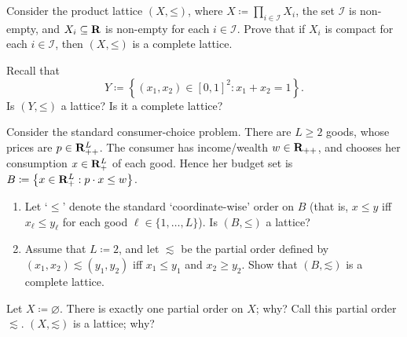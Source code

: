 \begin{exercise}
	\label{exercise:product_compl_lattice}
	Consider the product lattice $(X,\mathord{\leq})$, where $X \coloneqq \prod_{i \in \mathcal{I}} X_i$, the set $\mathcal{I}$ is non-empty, and $X_i \subseteq \mathbf{R}$ is non-empty for each $i \in \mathcal{I}$. Prove that if $X_i$ is compact for each $i \in \mathcal{I}$, then $(X,\mathord{\leq})$ is a complete lattice.
\end{exercise}

\begin{namedthm}
	\label{exercise:lb-R2_lat_e-g}
	Recall that
	\begin{equation*}
		Y \coloneqq \left\{ (x_1,x_2) \in [0,1]^2 : x_1 + x_2 = 1 \right\} .
	\end{equation*}
	Is $( Y, \mathord{\leq} )$ a lattice? Is it a complete lattice?
\end{namedthm}

\begin{exercise}
	\label{exercise:budget_set_latt}
	Consider the standard consumer-choice problem. There are $L \geq 2$ goods, whose prices are $p \in \mathbf{R}_{++}^L$. The consumer has income/wealth $w \in \mathbf{R}_{++}$, and chooses her consumption $x \in \mathbf{R}_+^L$ of each good. Hence her budget set is $B \coloneqq \left\{ x \in \R_+^L : p \cdot x \leq w \right\}$.

	\begin{enumerate}[label=(\alph*)]
	
		\item Let `$\leq$' denote the standard `coordinate-wise' order on $B$ (that is, $x \leq y$ iff $x_\ell \leq y_\ell$ for each good $\ell \in \{1,\dots,L\}$). Is $(B,\mathord{\leq})$ a lattice?

		\item Assume that $L \coloneq 2$, and let $\lesssim$ be the partial order defined by $(x_1,x_2) \lesssim (y_1,y_2)$ iff $x_1 \leq y_1$ and $x_2 \geq y_2$. Show that $(B,\mathord{\lesssim})$ is a complete lattice.
	
	\end{enumerate}
	
\end{exercise}

\begin{namedthm}
	\label{exercise:lb_empty_lat}
	Let $X \coloneqq \varnothing$. There is exactly one partial order on $X$; why? Call this partial order $\lesssim$. $(X,\mathord{\lesssim})$ is a lattice; why?
\end{namedthm}

